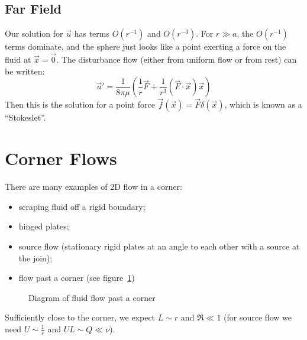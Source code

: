 \documentclass[../Main.tex]{subfiles}
\begin{document}
\subsection{Far Field}
Our solution for $\vec{u}$ has terms $O(r^{-1})$ and $O(r^{-3})$. For $r \gg a$, the $O(r^{-1})$ terms dominate, and the sphere just looks like a point exerting a force on the fluid at $\vec{x} = \vec{0}$. The disturbance flow (either from uniform flow or from rest) can be written:
\begin{equation*}
    \vec{u}' = \frac{1}{8\pi\mu} \left(\frac1r\vec{F} + \frac1{r^3}(\vec{F} \cdot \vec{x}) \vec{x}\right)
\end{equation*}
Then this is the solution for a point force $\vec{f}(\vec{x}) = \vec{F}\delta(\vec{x})$, which is known as a ``Stokeslet''.
\section{Corner Flows}
There are many examples of 2D flow in a corner:
\begin{itemize}
    \item scraping fluid off a rigid boundary;
    \item hinged plates;
    \item source flow (stationary rigid plates at an angle to each other with a source at the join);
    \item flow past a corner (see figure~\ref{figFlowCorner})
\end{itemize}
\begin{figure}
    \centering
    \caption{Diagram of fluid flow past a corner}
    \label{figFlowCorner}
\end{figure}
Sufficiently close to the corner, we expect $L \sim r$ and $\Re \ll 1$ (for source flow we need $U \sim \frac1r$ and $UL \sim Q \ll \nu$).
\end{document}
